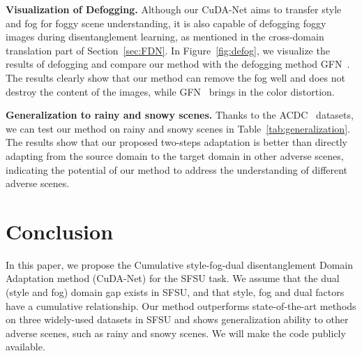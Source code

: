 \documentclass[10pt,twocolumn,letterpaper]{article}
\begin{document}
\noindent\textbf{Visualization of Defogging.} 
Although our CuDA-Net aims to transfer style and fog for foggy scene understanding, it is also capable of defogging foggy images during disentanglement learning, as mentioned in the cross-domain translation part of Section~\ref{sec:FDN}. 
In Figure~\ref{fig:defog}, we visualize the results of defogging and compare our method with the defogging method GFN~\cite{ren2018gated}.
The results clearly show that our method can remove the fog well and does not destroy the content of the images, while GFN~\cite{ren2018gated} brings in the color distortion. 


\begin{table}[t]
\begin{center}
\caption{\textbf{Generalization to rainy and snowy scenes.} We train our baseline on the ACDC rainy and snowy subsets and test it on the corresponding validation set, where  means we combine the  domain and  domain data as the whole target domain data.}
\label{tab:generalization}
\vspace{-6mm}
\end{center}
\end{table}

\noindent\textbf{Generalization to rainy and snowy scenes.} Thanks to the ACDC~\cite{ACDC} datasets, we can test our method on rainy and snowy scenes in Table~\ref{tab:generalization}. The results show that our proposed two-steps adaptation is better than directly adapting from the source domain to the target domain in other adverse scenes, indicating the potential of our method to address the understanding of different adverse scenes.
















\section{Conclusion}
In this paper, we propose the Cumulative style-fog-dual disentanglement Domain Adaptation method (CuDA-Net) for the SFSU task.
We assume that the dual (style and fog) domain gap exists in SFSU, and that style, fog and dual factors have a cumulative relationship. 
Our method outperforms state-of-the-art methods on three widely-used datasets in SFSU and shows generalization ability to other adverse scenes, such as rainy and snowy scenes. 
We will make the code publicly available.
\end{document}

